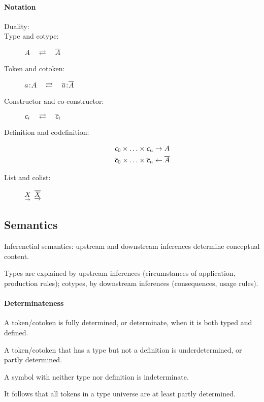 \documentclass{article}
\begin{document}
\paragraph{Notation}

\begin{description}
\item[Duality:] \dual
\item[Type and cotype:]\hspace{2em}\(A\hspace{1em}\rightleftarrows\hspace{1em} \overline{A}\)
\item[Token and cotoken:] \(a\hspace{1pt}\mathpunct{:}\hspace{-1pt}A\hspace{1em}\rightleftarrows\hspace{1em}
  \overline{a}\hspace{1pt}\mathpunct{:}\hspace{-1pt}\overline{A}\)
    \item[Constructor and co-constructor:] \(\ctor{i}\dual \coctor{i}\)
    \item[Definition and codefinition:]

      \begin{align}
       \ctor{0}\times\ldots\times\ctor{n} & \rightarrow A \nonumber \\
       \coctor{0}\times\ldots\times\coctor{n} & \leftarrow \cotype{A} \nonumber
      \end{align}
      \item[List and colist:] \(\underset{\rightarrow}{X}\) \dual \(\underrightarrow{\overline{X}}\)
\end{description}

\subsection{Semantics}

Inferenctial semantics: upstream and downstream inferences determine
conceptual content.

Types are explained by upstream inferences (circumstances of
application, production rules); cotypes, by downstream inferences
(consequences, usage rules).

\paragraph{Determinateness}

A token/cotoken is fully determined, or determinate, when it is both typed and defined.

A token/cotoken that has a type but not a definition is
underdetermined, or partly determined.

A symbol with neither type nor definition is indeterminate.

It follows that all tokens in a type universe are at least partly
determined.
\end{document}

